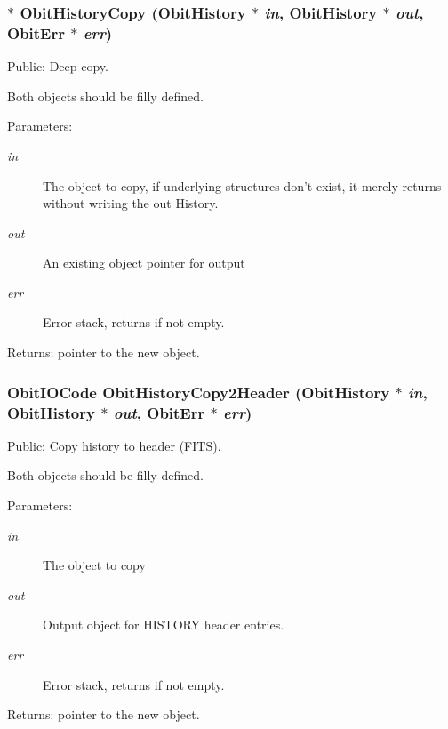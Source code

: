 \subsubsection{$\ast$ Obit\-History\-Copy ({\bf Obit\-History} $\ast$ {\em in}, {\bf Obit\-History} $\ast$ {\em out}, {\bf Obit\-Err} $\ast$ {\em err})}\label{ObitHistory_8c_a11}


Public: Deep copy. 

Both objects should be filly defined. \begin{Desc}
\item[Parameters:]
\begin{description}
\item[{\em in}]The object to copy, if underlying structures don't exist, it merely returns without writing the out History. \item[{\em out}]An existing object pointer for output \item[{\em err}]Error stack, returns if not empty. \end{description}
\end{Desc}
\begin{Desc}
\item[Returns:]pointer to the new object. \end{Desc}
\subsubsection{\setlength{\rightskip}{0pt plus 5cm}Obit\-IOCode Obit\-History\-Copy2Header ({\bf Obit\-History} $\ast$ {\em in}, {\bf Obit\-History} $\ast$ {\em out}, {\bf Obit\-Err} $\ast$ {\em err})}\label{ObitHistory_8c_a13}


Public: Copy history to header (FITS). 

Both objects should be filly defined. \begin{Desc}
\item[Parameters:]
\begin{description}
\item[{\em in}]The object to copy \item[{\em out}]Output object for HISTORY header entries. \item[{\em err}]Error stack, returns if not empty. \end{description}
\end{Desc}
\begin{Desc}
\item[Returns:]pointer to the new object. \end{Desc}
